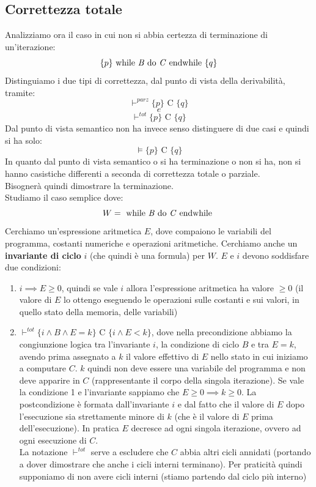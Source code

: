 \documentclass[a4paper,12pt, oneside]{book}
\begin{document}
\subsection{Correttezza totale}
Analizziamo ora il caso in cui non si abbia certezza di terminazione di
un'iterazione:
\[\{p\}\mbox{ while \textit{B} do \textit{C} endwhile }\{q\}\]
Distinguiamo i due tipi di correttezza, dal punto di vista della derivabilità,
tramite: 
\[\vdash^{parz}\{p\}\mbox{ C }\{q\}\]
\[e\]
\[\vdash^{tot}\{p\}\mbox{ C }\{q\}\]
Dal punto di vista semantico non ha invece senso distinguere di due casi e
quindi si ha solo:
\[\vDash\{p\}\mbox{ C }\{q\}\]
In quanto dal punto di vista semantico o si ha terminazione o non si ha, non si
hanno casistiche differenti a seconda di correttezza totale o parziale.\\
Bisognerà quindi dimostrare la terminazione.\\
Studiamo il caso semplice dove:
\[W=\mbox{ while \textit{B} do \textit{C} endwhile }\]
Cerchiamo un'espressione aritmetica $E$, dove compaiono le variabili del
programma, costanti numeriche e operazioni aritmetiche. Cerchiamo anche un
\textbf{invariante di ciclo} $i$ (che quindi è una formula) per $W$. $E$ e $i$
devono soddisfare due condizioni:
\begin{enumerate}
  \item $i\implies E\geq 0$, quindi se vale $i$ allora l'espressione aritmetica
  ha valore $\geq 0$ (il valore di $E$ lo ottengo eseguendo le operazioni sulle
  costanti e sui valori, in quello stato della memoria, delle variabili)
  \item $\vdash^{tot}\{i\land B\land E=k\}\mbox{ C }\{i\land E<k\}$, dove
  nella precondizione abbiamo la congiunzione logica tra l'invariante $i$, la
  condizione di ciclo $B$ e tra $E=k$, avendo prima assegnato a $k$ il valore
  effettivo di $E$ nello stato in cui iniziamo a computare $C$. $k$ quindi non
  deve essere una variabile del programma e non deve apparire in $C$
  (rappresentante il corpo della singola iterazione). Se vale la
  condizione 1 e l'invariante sappiamo che $E\geq 0\implies k\geq 0$. La
  postcondizione è formata dall'invariante $i$ e dal fatto che il valore di $E$
  dopo l'esecuzione sia strettamente minore di $k$ (che è il valore di $E$ prima
  dell'esecuzione). In pratica $E$ decresce ad ogni singola iterazione, ovvero
  ad ogni esecuzione di $C$.\\
  La notazione $\vdash^{tot}$ serve a escludere che $C$ abbia altri cicli
  annidati (portando a dover dimostrare che anche i cicli interni
  terminano). Per praticità quindi supponiamo di non avere cicli interni (stiamo
  partendo dal ciclo più interno)
\end{enumerate}
\end{document}
